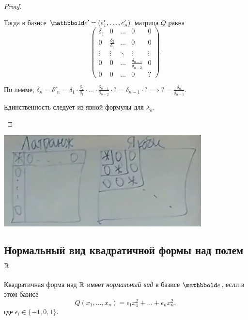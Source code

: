 \begin{proof}
\begin{description}
        Тогда в базисе $\E' = (e'_1, \dots, e'_n)$ матрица $Q$ равна
        \begin{equation*}
            \begin{pmatrix} 
                \delta_1 & 0 & \dots & 0 & 0 \\
                0 & \frac{\delta_2}{\delta_1} & \dots & 0 & 0 \\
                \vdots & \vdots & \ddots & \vdots & \vdots \\
                0 & 0 & \dots & \frac{\delta_{n - 1}}{\delta_{n - 2}} & 0 \\
                0 & 0 & \dots & 0 & ?
            \end{pmatrix}
        .\end{equation*}

        По лемме, $\delta_n = \delta'_n = \delta_1 \cdot \frac{\delta_2}{\delta_1} \cdot \dots \cdot \frac{\delta_{n - 1}}{\delta_{n - 2}} \cdot ? = \delta_{n - 1} \cdot ? \implies ? = \frac{\delta_n}{\delta_{n - 1}}$.

        Единственность следует из явной формулы для $\lambda_k$.
        \qedhere
    \end{description}
\end{proof}

\begin{center}
    \includegraphics[height=5cm]{img/lecture20_matrix}
\end{center}


\subsection{Нормальный вид квадратичной формы над полем $\mathbb{R}$}

\begin{definition}
    Квадратичная форма над $\mathbb{R}$ имеет \textit{нормальный вид} в базисе $\E$, если в этом базисе
    \begin{equation*}
        Q(x_1, \dots, x_n) = \epsilon_1 x_1^2 + \dots + \epsilon_n x_n^2
    ,\end{equation*}
    где $\epsilon_i \in \{-1, 0, 1\}$.
\end{definition}


